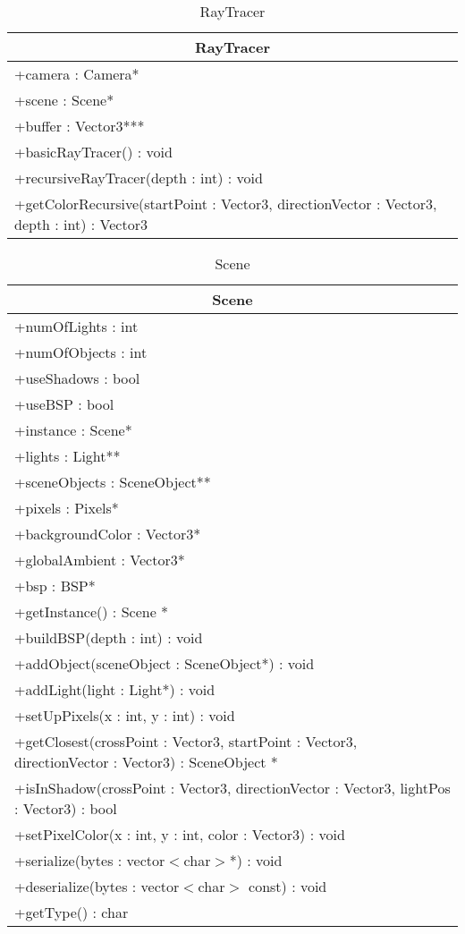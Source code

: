 \begin{longtable}{|p{16cm}|}
    \caption{RayTracer} \label{tab:RayTracer} \\ \hline
    \multicolumn{1}{|c|}{RayTracer} \\ \hline
    +camera : Camera* \\
    +scene : Scene* \\
    +buffer : Vector3*** \\ \hline
	+basicRayTracer() : void \\
	+recursiveRayTracer(depth : int) : void \\
	+getColorRecursive(startPoint : Vector3, directionVector : Vector3, depth : int) : Vector3 \\
	\hline
\end{longtable}

\begin{longtable}{|p{16cm}|}
    \caption{Scene} \label{tab:Scene} \\ \hline
    \multicolumn{1}{|c|}{Scene} \\ \hline
    +numOfLights : int \\
    +numOfObjects : int \\
    +useShadows : bool \\
    +useBSP : bool \\
    +instance : Scene* \\
    +lights : Light** \\
    +sceneObjects : SceneObject** \\
    +pixels : Pixels* \\
    +backgroundColor : Vector3* \\
    +globalAmbient : Vector3* \\
    +bsp : BSP* \\
    \hline
	+getInstance() : Scene * \\
	+buildBSP(depth : int) : void \\
	+addObject(sceneObject : SceneObject*) : void \\
	+addLight(light : Light*) : void \\
	+setUpPixels(x : int, y : int) : void \\
	+getClosest(crossPoint : Vector3, startPoint : Vector3, directionVector : Vector3) : SceneObject * \\
	+isInShadow(crossPoint : Vector3, directionVector : Vector3, lightPos : Vector3) : bool \\
	+setPixelColor(x : int, y : int, color : Vector3) : void \\
	+serialize(bytes : vector$<$char$>$*) : void \\
	+deserialize(bytes : vector$<$char$>$ const) : void \\
	+getType() : char \\
	\hline
\end{longtable}

